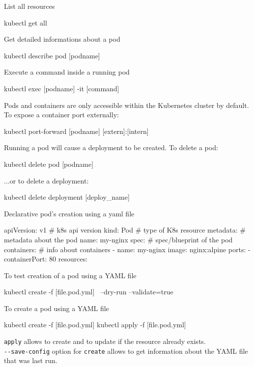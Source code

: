 \documentclass{refcard}
\begin{document}
List all resources
\begin{ttyenv}
kubectl get all
\end{ttyenv}

Get detailed informations about a pod
\begin{ttyenv}
kubectl describe pod [podname]
\end{ttyenv}

Execute a command inside a running pod
\begin{ttyenv}
kubectl exec [podname] -it [command]
\end{ttyenv}

Pods and containers are only accessible within the Kubernetes cluster by default. To expose a container port externally:
\begin{ttyenv}
kubectl port-forward [podname] [extern]:[intern]
\end{ttyenv}

Running a pod will cause a deployment to be created. To delete a pod:
\begin{ttyenv}
kubectl delete pod [podname]
\end{ttyenv}

...or to delete a deployment:
\begin{ttyenv}
kubectl delete deployment [deploy_name]
\end{ttyenv}

Declarative pod's creation using a yaml file

\begin{yamlbox}[title={nginx.pod.yml}]
apiVersion: v1  # k8s api version
  kind: Pod     # type of K8s resource
  metadata:     # metadata about the pod
    name: my-nginx
  spec:         # spec/blueprint of the pod
    containers: # info about containers
    - name: my-nginx
      image: nginx:alpine
      ports:
      - containerPort: 80
      resources:
\end{yamlbox}

To test creation of a pod using a YAML file
\begin{ttyenv}
kubectl create -f [file.pod.yml] \
  --dry-run --validate=true
\end{ttyenv}

To create a pod using a YAML file
\begin{ttyenv}
kubectl create -f [file.pod.yml] 
kubectl apply -f [file.pod.yml] 
\end{ttyenv}

\verb|apply| allows to create and to update if the resource already exists.\\
\verb|--save-config| option for \verb|create| allows to get information about the YAML file that was last run.\\
\end{document}
